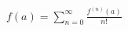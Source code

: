 \documentclass{standalone}
\begin{document}
$\displaystyle
f(a)=\sum_{n=0}^{\infty}{\frac{f^{(n)}(a)}{n!} }$
\end{document}

